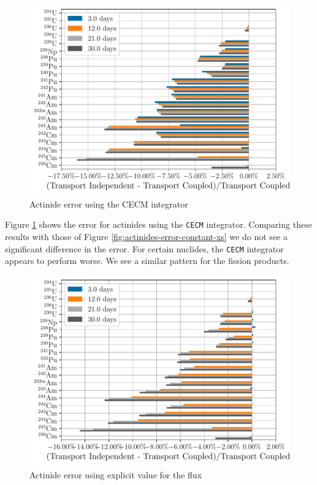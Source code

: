     \begin{figure}[htpb]
        \centering
        \includegraphics[width=\linewidth]{figs/actinides_constant_xs_cecm_fission_q_days.pdf}
        \caption{Actinide error using the CECM integrator}
        \label{fig:actinides-error-cecm}
    \end{figure}


    Figure \ref{fig:actinides-error-cecm} shows the error for actinides using the
    \verb.CECM. integrator. Comparing these results with those of Figure
    \ref{fig:actinides-error-constant-xs} we do not see a significant difference
    in the error. For certain nuclides, the \verb.CECM. integrator appears to
    perform worse. We see a similar pattern for the fission products.

    \begin{figure}[htpb]
        \centering
        \includegraphics[width=\linewidth]{figs/actinides_constant_xs_predictor_source_rate_days.pdf}
        \caption{Actinide error using explicit value for the flux}
        \label{fig:actinides-error-source}
    \end{figure}

